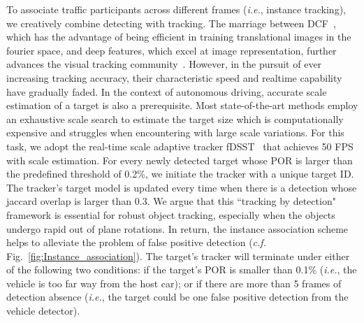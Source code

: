 \documentclass[10pt,twocolumn,letterpaper]{article}
\begin{document}
To associate traffic participants across different frames (\emph{i.e.}, instance tracking), we creatively combine detecting with tracking.
The marriage between DCF~\cite{henriques2015high}, which has the advantage of being efficient in training translational images in the fourier space, and deep features, which excel at image representation, further advances the visual tracking community~\cite{qi2016hedged, danelljan2016eccv, wu2017kernalised, danelljan2017eco}. However, in the pursuit of ever increasing tracking accuracy, their characteristic speed and realtime capability have gradually faded. In the context of autonomous driving, accurate scale estimation of a target is also a prerequisite. Most state-of-the-art methods employ an exhaustive scale search to estimate the target size which is computationally expensive and struggles when encountering with large scale variations.
For this task, we adopt the real-time scale adaptive tracker fDSST~\cite{danelljan2017discriminative} that achieves 50 FPS with scale estimation.
For every newly detected target whose POR is larger than the predefined threshold of 0.2\%, we initiate the tracker with a unique target ID. The tracker's target model is updated every time when there is a detection whose jaccard overlap is larger than 0.3. We argue that this ``tracking by detection" framework is essential for robust object tracking, especially when the objects undergo rapid out of plane rotations. In return, the instance association scheme helps to alleviate the problem of false positive detection (\emph{c.f.} Fig.~\ref{fig:Instance_association}).
The target's tracker will terminate under either of the following two conditions: if the target's POR is smaller than 0.1\% (\emph{i.e.}, the vehicle is too far way from the host car); or if there are more than 5 frames of detection absence  (\emph{i.e.}, the target could be one false positive detection from the vehicle detector).
\end{document}
